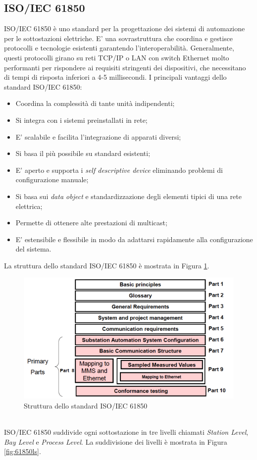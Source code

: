 \subsection{ISO/IEC 61850}
ISO/IEC 61850 è uno standard per la progettazione dei sistemi di automazione per le sottostazioni elettriche. E' una sovrastruttura che coordina e gestisce protocolli e tecnologie esistenti garantendo l'interoperabilità. Generalmente, questi protocolli girano su reti TCP/IP o LAN con switch Ethernet molto performanti per rispondere ai requisiti stringenti dei dispositivi, che necessitano di tempi di risposta inferiori a 4-5 millisecondi.\newline\newline
I principali vantaggi dello standard ISO/IEC 61850:
\begin{itemize}
	\item Coordina la complessità di tante unità indipendenti;
	\item Si integra con i sistemi preinstallati in rete;
	\item E' scalabile e facilita l'integrazione di apparati diversi;
	\item Si basa il più possibile su standard esistenti;
	\item E' aperto e supporta i \emph{self descriptive device} eliminando problemi di configurazione manuale;
	\item Si basa sui \emph{data object} e standardizzazione degli elementi tipici di una rete elettrica;
	\item Permette di ottenere alte prestazioni di multicast;
	\item E' estensibile e flessibile in modo da adattarsi rapidamente alla configurazione del sistema.
\end{itemize}
\newpage
La struttura dello standard ISO/IEC 61850\cite{iec61850} è mostrata in Figura \ref{fig:iec61850}.
\begin{figure}[h]
	\centering
	\includegraphics[scale=0.400]{imgs/iec61850.png}
	\caption{Struttura dello standard ISO/IEC 61850} \label{fig:iec61850}
\end{figure}\\
ISO/IEC 61850 suddivide ogni sottostazione in tre livelli\cite{iec61850} chiamati \emph{Station Level}, \emph{Bay Level} e \emph{Process Level}. La suddivisione dei livelli è mostrata in Figura \ref{fig:61850ls}.

